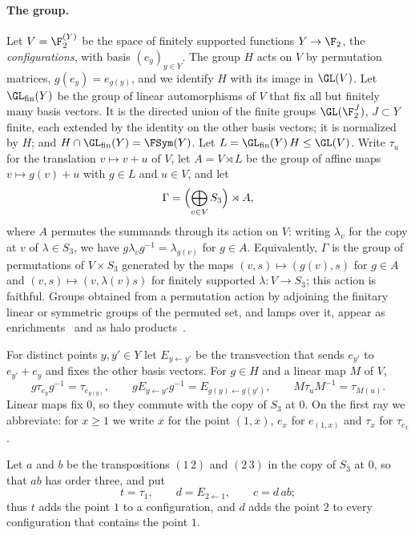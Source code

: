 \paragraph{The group.} Let $V=\F_2^{(Y)}$ be the space of finitely supported functions $Y\to\F_2$, the \emph{configurations}, with basis
$(e_y)_{y\in Y}$. The group $H$ acts on $V$ by permutation matrices, $g(e_y)=e_{g(y)}$, and we identify $H$ with its image in $\GL(V)$. Let
$\GL_{\rm fin}(Y)$ be the group of linear automorphisms of $V$ that fix all but finitely many basis vectors. It is the directed union of the finite
groups $\GL(\F_2^J)$, $J\subset Y$ finite, each extended by the identity on the other basis vectors; it is normalized by $H$; and
$H\cap\GL_{\rm fin}(Y)=\FSym(Y)$. Let $L=\GL_{\rm fin}(Y)\,H\le\GL(V)$. Write $\tau_u$ for the translation $v\mapsto v+u$ of $V$, let $A=V\rtimes L$
be the group of affine maps $v\mapsto g(v)+u$ with $g\in L$ and $u\in V$, and let
\[
\Gamma=\Bigl(\bigoplus_{v\in V}S_3\Bigr)\rtimes A,
\]
where $A$ permutes the summands through its action on $V$: writing $\lambda_v$ for the copy at $v$ of $\lambda\in S_3$, we have
$g\lambda_vg^{-1}=\lambda_{g(v)}$ for $g\in A$. Equivalently, $\Gamma$ is the group of permutations of $V\times S_3$ generated by the maps
$(v,s)\mapsto(g(v),s)$ for $g\in A$ and $(v,s)\mapsto(v,\lambda(v)s)$ for finitely supported $\lambda:V\to S_3$; this action is faithful. Groups obtained from a permutation action by adjoining the finitary linear or symmetric groups of the permuted
set, and lamps over it, appear as enrichments~\cite{Bradford2022,AlekseevBradford2026} and as halo products~\cite{GenevoisTessera2024}.

For distinct points $y,y'\in Y$ let $E_{y\leftarrow y'}$ be the transvection that sends $e_{y'}$ to $e_{y'}+e_y$ and fixes the other basis vectors.
For $g\in H$ and a linear map $M$ of $V$,
\begin{equation}\label{eq:affine-identities}
g\tau_{e_y}g^{-1}=\tau_{e_{g(y)}},\qquad gE_{y\leftarrow y'}g^{-1}=E_{g(y)\leftarrow g(y')},\qquad M\tau_uM^{-1}=\tau_{M(u)} .
\end{equation}
Linear maps fix $0$, so they commute with the copy of $S_3$ at $0$. On the first ray we abbreviate: for $x\ge1$ we write $x$ for the point $(1,x)$,
$e_x$ for $e_{(1,x)}$ and $\tau_x$ for $\tau_{e_x}$.

Let $a$ and $b$ be the transpositions $(1\,2)$ and $(2\,3)$ in the copy of $S_3$ at $0$, so that $ab$ has order three, and put
\[
t=\tau_1,\qquad d=E_{2\leftarrow1},\qquad c=d\,ab ;
\]
thus $t$ adds the point $1$ to a configuration, and $d$ adds the point $2$ to every configuration that contains the point $1$.

